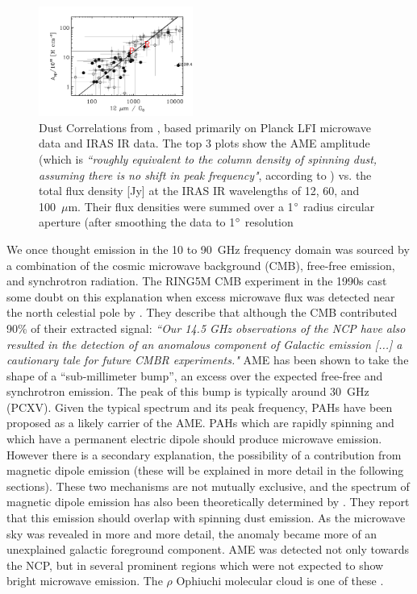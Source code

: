 \begin{figure}[tb]
\begin{center}
\includegraphics[width=0.45\textwidth]{EPS/fig18_6.pdf}
\caption{Dust Correlations from \cite{planckXV}, based primarily on Planck LFI \citep{lfi14ii} microwave data and IRAS IR data. The top 3 plots show the AME amplitude (which is \textit{``roughly equivalent to the column density of spinning dust, assuming there is no shift in peak frequency"}, according to \cite{planckXV}) vs. the total flux density [Jy] at the IRAS IR wavelengths of 12, 60, and 100~$\mu$m. Their flux densities were summed over a 1$\degree$ radius circular aperture (after smoothing the data to 1$\degree$ resolution}
\label{planckcorrel}
\end{center}
\end{figure}
     We once thought emission in the 10 to 90~GHz frequency domain was sourced by a combination of the cosmic microwave background (CMB), free-free emission, and synchrotron radiation. The RING5M CMB experiment in the 1990s cast some doubt on this explanation when excess microwave flux was detected near the north celestial pole by \cite{leitch98}. They describe that although the CMB contributed 90\% of their extracted signal: \textit{``Our 14.5 GHz observations of the NCP have also resulted in the detection of an anomalous component of Galactic emission [...] a cautionary tale for future CMBR experiments."}
     AME has been shown to take the shape of a ``sub-millimeter bump”, an excess over the expected free-free and synchrotron emission. The peak of this bump is typically around 30~GHz (PCXV). Given the typical spectrum and its peak frequency, PAHs have been proposed as a likely carrier of the AME. PAHs which are rapidly spinning and which have a permanent electric dipole should produce microwave emission. However there is a secondary explanation, the possibility of a contribution from magnetic dipole emission (these will be explained in more detail in the following sections). These two mechanisms are not mutually exclusive, and the spectrum of magnetic dipole emission has also been theoretically determined by \cite{draine99}. They report that this emission should overlap with spinning dust emission.
     As the microwave sky was revealed in more and more detail, the anomaly became more of an unexplained galactic foreground component. AME was detected not only towards the NCP, but in several prominent regions which were not expected to show bright microwave emission. The $\rho$ Ophiuchi molecular cloud is one of these \citep{casassus08}. 
